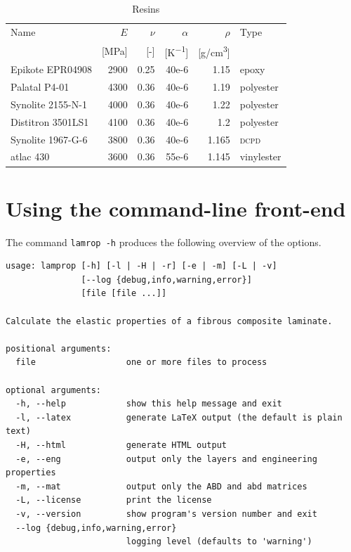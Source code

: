 \documentclass[a4paper,landscape,oneside,11pt,twocolumn]{memoir}
\begin{document}
\begin{table}[!htbp]
  \centering
  \caption{\label{tb:resins}Resins}
  \begin{tabular}{lrrrrl}%
      Name & $E$ & $\nu$ & $\alpha$ & $\rho$ & Type\\
      & [\si{MPa}] & [-] & [\si{K^{-1}}] & [\si{g/cm^3}]\\
    \midrule
      Epikote EPR04908 & 2900 & 0.25 & 40e-6 & 1.15 & epoxy\\
      Palatal P4-01 & 4300 & 0.36 & 40e-6 & 1.19 & polyester\\
      Synolite 2155-N-1 & 4000 & 0.36 & 40e-6 & 1.22 & polyester\\
      Distitron 3501LS1 & 4100 & 0.36 & 40e-6 & 1.2 & polyester\\
      Synolite 1967-G-6 & 3800 & 0.36 & 40e-6 & 1.165 & \textsc{dcpd}\\
      atlac 430 & 3600 & 0.36 & 55e-6 & 1.145 & vinylester\\
  \end{tabular}
\end{table}

\section{Using the command-line front-end} %

The command \texttt{lamrop -h} produces the following overview of the options.

\begin{lstlisting}[style=plain]
usage: lamprop [-h] [-l | -H | -r] [-e | -m] [-L | -v]
               [--log {debug,info,warning,error}]
               [file [file ...]]

Calculate the elastic properties of a fibrous composite laminate.

positional arguments:
  file                  one or more files to process

optional arguments:
  -h, --help            show this help message and exit
  -l, --latex           generate LaTeX output (the default is plain text)
  -H, --html            generate HTML output
  -e, --eng             output only the layers and engineering properties
  -m, --mat             output only the ABD and abd matrices
  -L, --license         print the license
  -v, --version         show program's version number and exit
  --log {debug,info,warning,error}
                        logging level (defaults to 'warning')
\end{lstlisting}
\end{document}
